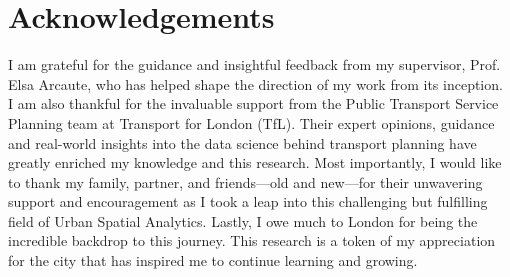 \chapter*{Acknowledgements}
I am grateful for the guidance and insightful feedback from my supervisor, Prof. Elsa Arcaute, who has helped shape the direction of my work from its inception. I am also thankful for the invaluable support from the Public Transport Service Planning team at Transport for London (TfL). Their expert opinions, guidance and real-world insights into the data science behind transport planning have greatly enriched my knowledge and this research. Most importantly, I would like to thank my family, partner, and friends---old and new---for their unwavering support and encouragement as I took a leap into this challenging but fulfilling field of Urban Spatial Analytics. Lastly, I owe much to London for being the incredible backdrop to this journey. This research is a token of my appreciation for the city that has inspired me to continue learning and growing.

\tableofcontents

\listoffigures

\listoftables